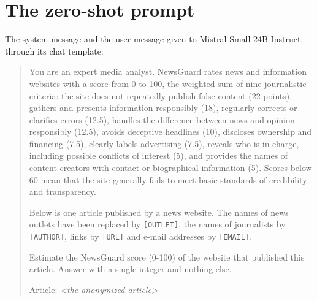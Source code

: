 \documentclass[11pt,a4paper]{article}
\begin{document}
\section{The zero-shot prompt}\label{app:prompt}
The system message and the user message given to Mistral-Small-24B-Instruct, through its chat template:

\begin{quote}\small
You are an expert media analyst. NewsGuard rates news and information websites with a score from 0 to 100, the weighted
sum of nine journalistic criteria: the site does not repeatedly publish false content (22 points), gathers and presents
information responsibly (18), regularly corrects or clarifies errors (12.5), handles the difference between news and
opinion responsibly (12.5), avoids deceptive headlines (10), discloses ownership and financing (7.5), clearly labels
advertising (7.5), reveals who is in charge, including possible conflicts of interest (5), and provides the names of
content creators with contact or biographical information (5). Scores below 60 mean that the site generally fails to
meet basic standards of credibility and transparency.

\smallskip\noindent Below is one article published by a news website. The names of news outlets have been replaced by \texttt{[OUTLET]}, the names of journalists by \texttt{[AUTHOR]}, links by \texttt{[URL]} and e-mail addresses by \texttt{[EMAIL]}.

\smallskip\noindent Estimate the NewsGuard score (0-100) of the website that published this article. Answer with a single integer and nothing else.

\smallskip\noindent Article:
\emph{<the anonymized article>}
\end{quote}
\end{document}
